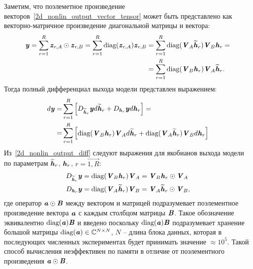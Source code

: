 Заметим, что поэлеметное произведение векторов~\eqref{2d_nonlin_output_vector_tensor} может быть представлено как векторно-матричное произведение диагональной матрицы и вектора:
\begin{align}
	\textbf{\textit{y}}=\sum_{r=1}^{R}\textbf{\textit{z}}_{r, A}\odot\textbf{\textit{z}}_{r, B}=\sum_{r=1}^{R}\text{diag}(\textbf{\textit{z}}_{r, A})\textbf{\textit{z}}_{r, B}&=\sum_{r=1}^{R}\text{diag}(\textbf{\textit{V}}_A\widetilde{\textbf{\textit{h}}}_r)\textbf{\textit{V}}_B\textbf{\textit{h}}_r= \nonumber \\
	&=\sum_{r=1}^{R}\text{diag}(\textbf{\textit{V}}_B\textbf{\textit{h}}_r)\textbf{\textit{V}}_A\widetilde{\textbf{\textit{h}}}_r.
	\label{2d_nonlin_output_vector_tensor_diag}
\end{align}
Тогда полный дифференциал выхода модели представлен выражением:
\begin{align}
	d\textbf{\textit{y}}=&\sum_{r=1}^{R}
	\begin{bmatrix}
		D_{\widetilde{\textbf{\textit{h}}}_r}\textbf{\textit{y}}d\widetilde{\textbf{\textit{h}}}_r+
		D_{\textbf{\textit{h}}_r}\textbf{\textit{y}}d\textbf{\textit{h}}_r
	\end{bmatrix}= \nonumber \\
	=&
	\sum_{r=1}^{R}
	\begin{bmatrix}
		\text{diag}(\textbf{\textit{V}}_B\textbf{\textit{h}}_r)\textbf{\textit{V}}_Ad\widetilde{\textbf{\textit{h}}}_r+
		\text{diag}(\textbf{\textit{V}}_A\widetilde{\textbf{\textit{h}}}_r)\textbf{\textit{V}}_Bd\textbf{\textit{h}}_r
	\end{bmatrix}
	\label{2d_nonlin_output_diff}
\end{align}
Из~\eqref{2d_nonlin_output_diff} следуют выражения для якобианов выхода модели по параметрам $\widetilde{\textbf{\textit{h}}}_r$, $\textbf{\textit{h}}_r$, $r=\overrightarrow{1, R}$:
\begin{align}
	&D_{\widetilde{\textbf{\textit{h}}}_r}\textbf{\textit{y}}=
	\text{diag}(\textbf{\textit{V}}_B\textbf{\textit{h}}_r)\textbf{\textit{V}}_A=
	\textbf{\textit{V}}_B\textbf{\textit{h}}_r\odot\textbf{\textit{V}}_A \\
	& D_{\textbf{\textit{h}}_r}\textbf{\textit{y}}=\text{diag}(\textbf{\textit{V}}_A\widetilde{\textbf{\textit{h}}}_r)\textbf{\textit{V}}_B=
	\textbf{\textit{V}}_A\widetilde{\textbf{\textit{h}}}_r\odot\textbf{\textit{V}}_B,
	\label{jac_tensor}
\end{align}
где оператор $\textbf{\textit{a}}\odot\textbf{\textit{B}}$ между вектором и матрицей подразумевает поэлементное произведение вектора $\textbf{\textit{a}}$ с каждым столбцом матрицы $\textbf{\textit{B}}$. Такое обозначение эквивалентно $\text{diag}(\textbf{\textit{a}})\textbf{\textit{B}}$ и введено поскольку $\text{diag}(\textbf{\textit{a}})\textbf{\textit{B}}$ подразумевает хранение большой матрицы $\text{diag}(\textbf{\textit{a}})\in\mathbb{C}^{N\times N}$, $N$ -- длина блока данных, которая в последующих численных экспериментах будет принимать значение $\approx10^5$. Такой способ вычисления неэффективен по памяти в отличие от поэлементного произведения $\textbf{\textit{a}}\odot\textbf{\textit{B}}$.

